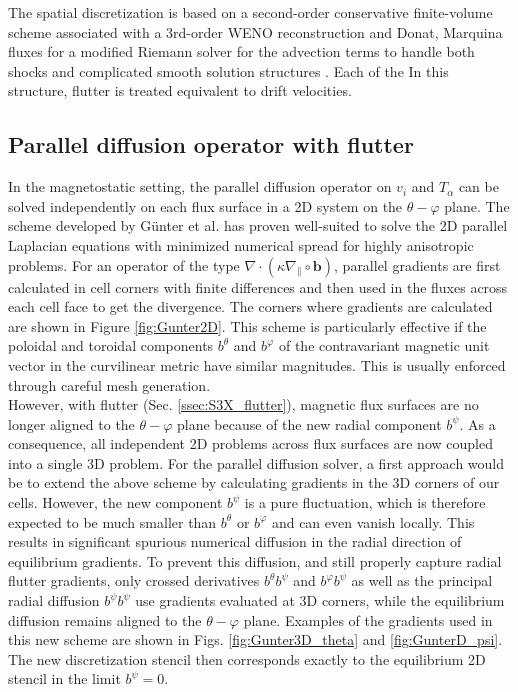 The spatial discretization is based on a second-order conservative finite-volume scheme associated with a 3rd-order WENO reconstruction and Donat, Marquina fluxes for a modified Riemann solver for the advection terms to handle both shocks and complicated smooth solution structures \cite{tamain2016tokam3x, Bufferand2021}. \newline
Each of the In this structure, flutter is treated equivalent to drift velocities. 



\subsection{Parallel diffusion operator with flutter}
\label{ssec:3DGunter}

In the magnetostatic setting, the parallel diffusion operator on $v_i$ and $T_\alpha$ can be solved independently on each flux surface in a 2D system on the $\theta - \varphi$ plane. The scheme developed by Günter et al. \cite{gunter2005} has proven well-suited to solve the 2D parallel Laplacian equations with minimized numerical spread for highly anisotropic problems. For an operator of the type $\nabla \cdot (\kappa \nabla_\parallel \circ \mathbf{b} )$, parallel gradients are first calculated in cell corners with finite differences and then used in the fluxes across each cell face to get the divergence. The corners where gradients are calculated are shown in Figure \ref{fig:Gunter2D}. This scheme is particularly effective if the poloidal and toroidal components $b^\theta$ and $b^\varphi$ of the contravariant magnetic unit vector in the curvilinear metric have similar magnitudes. This is usually enforced through careful mesh generation. \\

However, with flutter (Sec. \ref{ssec:S3X_flutter}), magnetic flux surfaces are no longer aligned to the $\theta - \varphi$ plane because of the new radial component $b^\psi$. As a consequence, all independent 2D problems across flux surfaces are now coupled into a single 3D problem. For the parallel diffusion solver, a first approach would be to extend the above scheme by calculating gradients in the 3D corners of our cells. However, the new component $b^\psi$ is a pure fluctuation, which is therefore expected to be much smaller than $b^\theta$ or $b^\varphi$ and can even vanish locally. This results in significant spurious numerical diffusion in the radial direction of equilibrium gradients. To prevent this diffusion, and still properly capture radial flutter gradients, only crossed derivatives $b^\theta b^\psi$ and $b^\varphi b^\psi$ as well as the principal radial diffusion $b^\psi b^\psi$ use gradients evaluated at 3D corners, while the equilibrium diffusion remains aligned to the $\theta - \varphi$ plane. Examples of the gradients used in this new scheme are shown in Figs. \ref{fig:Gunter3D_theta} and \ref{fig:GunterD_psi}. The new discretization stencil then corresponds exactly to the equilibrium 2D stencil in the limit $b^\psi=0$. \newline

